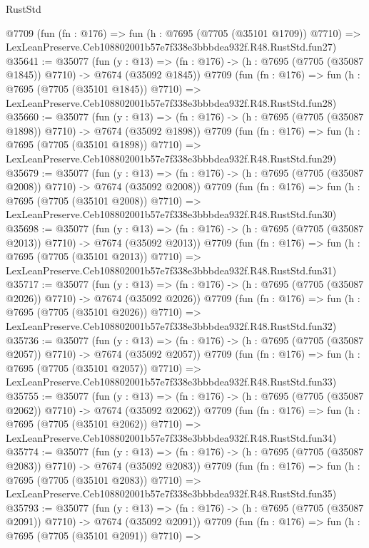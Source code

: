 \begin{lexlean}{RustStd}
\begin{coremodule}
    @7709
    (fun (fn : @176) =>
    fun (h : @7695 (@7705 (@35101 @1709)) @7710) =>
    LexLeanPreserve.Ceb108802001b57e7f338e3bbbdea932f.R48.RustStd.fun27)
@35641 := @35077
    (fun (y : @13) =>
    (fn : @176) -> (h : @7695 (@7705 (@35087 @1845)) @7710) -> @7674 (@35092 @1845))
    @7709
    (fun (fn : @176) =>
    fun (h : @7695 (@7705 (@35101 @1845)) @7710) =>
    LexLeanPreserve.Ceb108802001b57e7f338e3bbbdea932f.R48.RustStd.fun28)
@35660 := @35077
    (fun (y : @13) =>
    (fn : @176) -> (h : @7695 (@7705 (@35087 @1898)) @7710) -> @7674 (@35092 @1898))
    @7709
    (fun (fn : @176) =>
    fun (h : @7695 (@7705 (@35101 @1898)) @7710) =>
    LexLeanPreserve.Ceb108802001b57e7f338e3bbbdea932f.R48.RustStd.fun29)
@35679 := @35077
    (fun (y : @13) =>
    (fn : @176) -> (h : @7695 (@7705 (@35087 @2008)) @7710) -> @7674 (@35092 @2008))
    @7709
    (fun (fn : @176) =>
    fun (h : @7695 (@7705 (@35101 @2008)) @7710) =>
    LexLeanPreserve.Ceb108802001b57e7f338e3bbbdea932f.R48.RustStd.fun30)
@35698 := @35077
    (fun (y : @13) =>
    (fn : @176) -> (h : @7695 (@7705 (@35087 @2013)) @7710) -> @7674 (@35092 @2013))
    @7709
    (fun (fn : @176) =>
    fun (h : @7695 (@7705 (@35101 @2013)) @7710) =>
    LexLeanPreserve.Ceb108802001b57e7f338e3bbbdea932f.R48.RustStd.fun31)
@35717 := @35077
    (fun (y : @13) =>
    (fn : @176) -> (h : @7695 (@7705 (@35087 @2026)) @7710) -> @7674 (@35092 @2026))
    @7709
    (fun (fn : @176) =>
    fun (h : @7695 (@7705 (@35101 @2026)) @7710) =>
    LexLeanPreserve.Ceb108802001b57e7f338e3bbbdea932f.R48.RustStd.fun32)
@35736 := @35077
    (fun (y : @13) =>
    (fn : @176) -> (h : @7695 (@7705 (@35087 @2057)) @7710) -> @7674 (@35092 @2057))
    @7709
    (fun (fn : @176) =>
    fun (h : @7695 (@7705 (@35101 @2057)) @7710) =>
    LexLeanPreserve.Ceb108802001b57e7f338e3bbbdea932f.R48.RustStd.fun33)
@35755 := @35077
    (fun (y : @13) =>
    (fn : @176) -> (h : @7695 (@7705 (@35087 @2062)) @7710) -> @7674 (@35092 @2062))
    @7709
    (fun (fn : @176) =>
    fun (h : @7695 (@7705 (@35101 @2062)) @7710) =>
    LexLeanPreserve.Ceb108802001b57e7f338e3bbbdea932f.R48.RustStd.fun34)
@35774 := @35077
    (fun (y : @13) =>
    (fn : @176) -> (h : @7695 (@7705 (@35087 @2083)) @7710) -> @7674 (@35092 @2083))
    @7709
    (fun (fn : @176) =>
    fun (h : @7695 (@7705 (@35101 @2083)) @7710) =>
    LexLeanPreserve.Ceb108802001b57e7f338e3bbbdea932f.R48.RustStd.fun35)
@35793 := @35077
    (fun (y : @13) =>
    (fn : @176) -> (h : @7695 (@7705 (@35087 @2091)) @7710) -> @7674 (@35092 @2091))
    @7709
    (fun (fn : @176) =>
    fun (h : @7695 (@7705 (@35101 @2091)) @7710) =>

\end{coremodule}
\end{lexlean}
